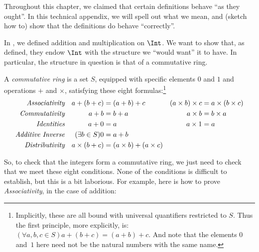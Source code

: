 \documentclass[../../../include/open-logic-section]{subfiles}
\begin{document}
	

Throughout this chapter, we claimed that certain definitions behave
``as they ought''. In this technical appendix, we will spell out what
we mean, and (sketch how to) show that the definitions do behave
``correctly''. 

In , we defined addition and multiplication on $\Int$.
We want to show that, as defined, they endow $\Int$ with the structure
we ``would want'' it to have. In particular, the structure in question
is that of a commutative ring.

\begin{defn}
	A \emph{commutative ring} is a set $S$, equipped with specific elements $0$ and $1$ and operations $+$ and $\times$, satisfying these eight formulas:\footnote{Implicitly, these are all bound with universal quantifiers restricted to $S$. Thus the first principle, more explicitly, is: $(\forall a, b, c \in S)a + (b+c) = (a+b)+c$. And note that the elements $0$ and~$1$ here need not be the natural numbers with the same name.}
	\begin{align*}
		\emph{Associativity}&&a + (b+ c) & = (a + b) + c & (a \times b) \times c & = a \times (b\times c)\\
		\emph{Commutativity}&&a + b &= b+ a  &  a \times b&= b\times a\\ 
		\emph{Identities}&&a + 0 &= a & a \times 1 &= a\\
		\emph{Additive Inverse}&&(\exists b\in S)0&=a + b\\
		\emph{Distributivity}&&a \times (b+ c ) &= (a \times b) + (a \times c)
	\end{align*}
\end{defn}

So, to check that the integers form a commutative ring, we just need
to check that we meet these eight conditions. None of the conditions
is {difficult} to establish, but this is a bit laborious. For example,
here is how to prove \emph{Associativity}, in the case of addition:
\end{document}
